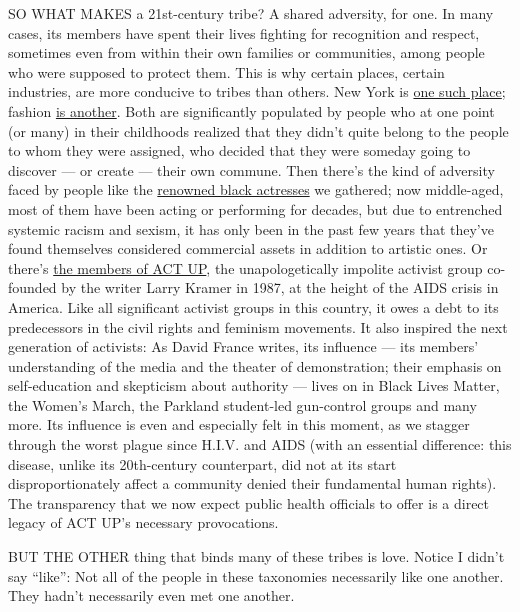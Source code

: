 SO WHAT MAKES a 21st-century tribe? A shared adversity, for one. In many
cases, its members have spent their lives fighting for recognition and
respect, sometimes even from within their own families or communities,
among people who were supposed to protect them. This is why certain
places, certain industries, are more conducive to tribes than others.
New York is
\href{https://www.nytimes.com/interactive/2020/04/13/t-magazine/ninth-street-greenwich-village-neighbors.html}{one
such place}; fashion
\href{https://www.nytimes.com/interactive/2020/04/13/t-magazine/maria-cornejo-olivier-rousteing-telfar-clemens-alessandro-michele.html}{is
another}. Both are significantly populated by people who at one point
(or many) in their childhoods realized that they didn't quite belong to
the people to whom they were assigned, who decided that they were
someday going to discover --- or create --- their own commune. Then
there's the kind of adversity faced by people like the
\href{https://www.nytimes.com/interactive/2020/04/13/t-magazine/black-actresses-bassett-berry-blige-henson-whitfield-elise.html}{renowned
black actresses} we gathered; now middle-aged, most of them have been
acting or performing for decades, but due to entrenched systemic racism
and sexism, it has only been in the past few years that they've found
themselves considered commercial assets in addition to artistic ones. Or
there's
\href{https://www.nytimes.com/interactive/2020/04/13/t-magazine/act-up-aids.html}{the
members of ACT UP}, the unapologetically impolite activist group
co-founded by the writer Larry Kramer in 1987, at the height of the AIDS
crisis in America. Like all significant activist groups in this country,
it owes a debt to its predecessors in the civil rights and feminism
movements. It also inspired the next generation of activists: As David
France writes, its influence --- its members' understanding of the media
and the theater of demonstration; their emphasis on self-education and
skepticism about authority --- lives on in Black Lives Matter, the
Women's March, the Parkland student-led gun-control groups and many
more. Its influence is even and especially felt in this moment, as we
stagger through the worst plague since H.I.V. and AIDS (with an
essential difference: this disease, unlike its 20th-century counterpart,
did not at its start disproportionately affect a community denied their
fundamental human rights). The transparency that we now expect public
health officials to offer is a direct legacy of ACT UP's necessary
provocations.

BUT THE OTHER thing that binds many of these tribes is love. Notice I
didn't say ``like'': Not all of the people in these taxonomies
necessarily like one another. They hadn't necessarily even met one
another.

